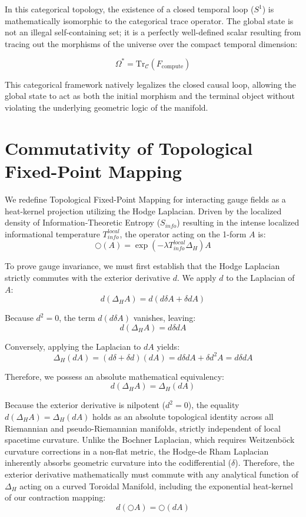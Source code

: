 \documentclass[12pt,openany]{book}
\theoremstyle{plain}
\theoremstyle{definition}
\theoremstyle{remark}
\begin{document}
In this categorical topology, the existence of a closed temporal loop ($S^1$) is mathematically isomorphic to the categorical trace operator. The global state is not an illegal self-containing set; it is a perfectly well-defined scalar resulting from tracing out the morphisms of the universe over the compact temporal dimension:

$$ \Omega^* = \text{Tr}_{\mathcal{C}}(F_{\text{compute}}) $$

This categorical framework natively legalizes the closed causal loop, allowing the global state to act as both the initial morphism and the terminal object without violating the underlying geometric logic of the manifold.

\section{Commutativity of Topological Fixed-Point Mapping}
We redefine Topological Fixed-Point Mapping for interacting gauge fields as a heat-kernel projection utilizing the Hodge Laplacian. Driven by the localized density of Information-Theoretic Entropy ($S_{info}$) resulting in the intense localized informational temperature $T_{info}^{local}$, the operator acting on the 1-form $A$ is:
$$ \bigcirc(A) = \exp(-\lambda T_{info}^{local} \Delta_H) A $$

To prove gauge invariance, we must first establish that the Hodge Laplacian strictly commutes with the exterior derivative $d$. We apply $d$ to the Laplacian of $A$:
$$ d(\Delta_H A) = d(d\delta A + \delta d A) $$

Because $d^2 = 0$, the term $d(d\delta A)$ vanishes, leaving:
$$ d(\Delta_H A) = d\delta d A $$

Conversely, applying the Laplacian to $dA$ yields:
$$ \Delta_H(dA) = (d\delta + \delta d)(dA) = d\delta d A + \delta d^2 A = d\delta d A $$

Therefore, we possess an absolute mathematical equivalency:
$$ d(\Delta_H A) = \Delta_H(dA) $$

Because the exterior derivative is nilpotent ($d^2 = 0$), the equality $d(\Delta_H A) = \Delta_H(dA)$ holds as an absolute topological identity across all Riemannian and pseudo-Riemannian manifolds, strictly independent of local spacetime curvature. Unlike the Bochner Laplacian, which requires Weitzenböck curvature corrections in a non-flat metric, the Hodge-de Rham Laplacian inherently absorbs geometric curvature into the codifferential ($\delta$). Therefore, the exterior derivative mathematically must commute with any analytical function of $\Delta_H$ acting on a curved Toroidal Manifold, including the exponential heat-kernel of our contraction mapping:
$$ d(\bigcirc A) = \bigcirc (dA) $$
\end{document}
